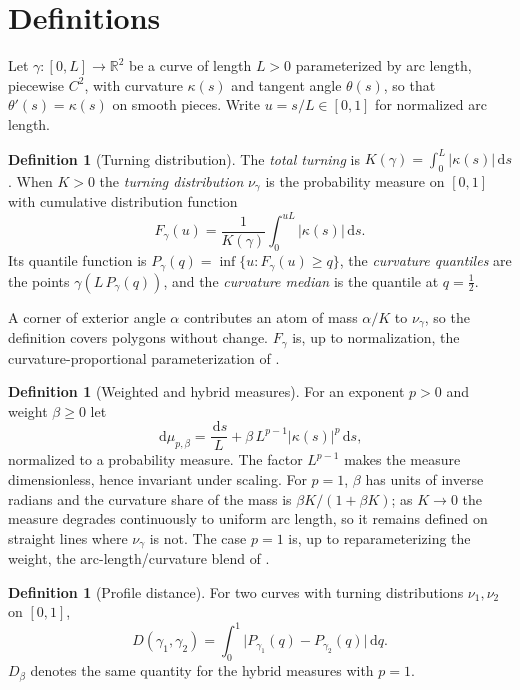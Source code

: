 \documentclass[11pt]{amsart}
\theoremstyle{definition}
\newtheorem{definition}[theorem]{Definition}
\theoremstyle{remark}
\newcommand{\dd}{\,\mathrm{d}}
\newcommand{\R}{\mathbb{R}}
\begin{document}
\section{Definitions}\label{sec:defs}

Let $\gamma:[0,L]\to\R^2$ be a curve of length $L>0$ parameterized by arc length, piecewise $C^2$, with curvature $\kappa(s)$ and tangent angle $\theta(s)$, so that $\theta'(s)=\kappa(s)$ on smooth pieces. Write $u=s/L\in[0,1]$ for normalized arc length.

\begin{definition}[Turning distribution]
The \emph{total turning} is $K(\gamma)=\int_0^L|\kappa(s)|\dd s$. When $K>0$ the \emph{turning distribution} $\nu_\gamma$ is the probability measure on $[0,1]$ with cumulative distribution function
\[
F_\gamma(u)=\frac{1}{K(\gamma)}\int_0^{uL}|\kappa(s)|\dd s .
\]
Its quantile function is $P_\gamma(q)=\inf\{u: F_\gamma(u)\ge q\}$, the \emph{curvature quantiles} are the points $\gamma(L\,P_\gamma(q))$, and the \emph{curvature median} is the quantile at $q=\tfrac12$.
\end{definition}

A corner of exterior angle $\alpha$ contributes an atom of mass $\alpha/K$ to $\nu_\gamma$, so the definition covers polygons without change. $F_\gamma$ is, up to normalization, the curvature-proportional parameterization of \cite{tumpach2023canonical}.

\begin{definition}[Weighted and hybrid measures]
For an exponent $p>0$ and weight $\beta\ge0$ let
\[
\dd\mu_{p,\beta}=\frac{\dd s}{L}+\beta\,L^{p-1}|\kappa(s)|^{p}\dd s ,
\]
normalized to a probability measure. The factor $L^{p-1}$ makes the measure dimensionless, hence invariant under scaling. For $p=1$, $\beta$ has units of inverse radians and the curvature share of the mass is $\beta K/(1+\beta K)$; as $K\to0$ the measure degrades continuously to uniform arc length, so it remains defined on straight lines where $\nu_\gamma$ is not. The case $p=1$ is, up to reparameterizing the weight, the arc-length/curvature blend of \cite{tumpach2023canonical}.
\end{definition}

\begin{definition}[Profile distance]
For two curves with turning distributions $\nu_1,\nu_2$ on $[0,1]$,
\[
D(\gamma_1,\gamma_2)=\int_0^1\bigl|P_{\gamma_1}(q)-P_{\gamma_2}(q)\bigr|\dd q .
\]
$D_\beta$ denotes the same quantity for the hybrid measures with $p=1$.
\end{definition}
\end{document}
